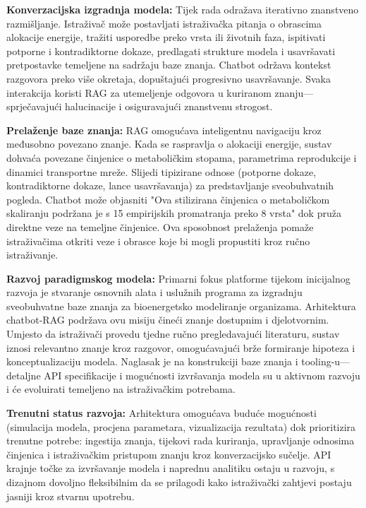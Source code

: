 \documentclass[12pt,a4paper]{article}
\begin{document}
\textbf{Konverzacijska izgradnja modela:} Tijek rada odražava iterativno znanstveno razmišljanje. Istraživač može postavljati istraživačka pitanja o obrascima alokacije energije, tražiti usporedbe preko vrsta ili životnih faza, ispitivati potporne i kontradiktorne dokaze, predlagati strukture modela i usavršavati pretpostavke temeljene na sadržaju baze znanja. Chatbot održava kontekst razgovora preko više okretaja, dopuštajući progresivno usavršavanje. Svaka interakcija koristi RAG za utemeljenje odgovora u kuriranom znanju—sprječavajući halucinacije i osiguravajući znanstvenu strogost.

\textbf{Prelaženje baze znanja:} RAG omogućava inteligentnu navigaciju kroz međusobno povezano znanje. Kada se raspravlja o alokaciji energije, sustav dohvaća povezane činjenice o metaboličkim stopama, parametrima reprodukcije i dinamici transportne mreže. Slijedi tipizirane odnose (potporne dokaze, kontradiktorne dokaze, lance usavršavanja) za predstavljanje sveobuhvatnih pogleda. Chatbot može objasniti "Ova stilizirana činjenica o metaboličkom skaliranju podržana je s 15 empirijskih promatranja preko 8 vrsta" dok pruža direktne veze na temeljne činjenice. Ova sposobnost prelaženja pomaže istraživačima otkriti veze i obrasce koje bi mogli propustiti kroz ručno istraživanje.

\textbf{Razvoj paradigmskog modela:} Primarni fokus platforme tijekom inicijalnog razvoja je stvaranje osnovnih alata i uslužnih programa za izgradnju sveobuhvatne baze znanja za bioenergetsko modeliranje organizama. Arhitektura chatbot-RAG podržava ovu misiju čineći znanje dostupnim i djelotvornim. Umjesto da istraživači provedu tjedne ručno pregledavajući literaturu, sustav iznosi relevantno znanje kroz razgovor, omogućavajući brže formiranje hipoteza i konceptualizaciju modela. Naglasak je na konstrukciji baze znanja i tooling-u—detaljne API specifikacije i mogućnosti izvršavanja modela su u aktivnom razvoju i će evoluirati temeljeno na istraživačkim potrebama.

\textbf{Trenutni status razvoja:} Arhitektura omogućava buduće mogućnosti (simulacija modela, procjena parametara, vizualizacija rezultata) dok prioritizira trenutne potrebe: ingestija znanja, tijekovi rada kuriranja, upravljanje odnosima činjenica i istraživačkim pristupom znanju kroz konverzacijsko sučelje. API krajnje točke za izvršavanje modela i naprednu analitiku ostaju u razvoju, s dizajnom dovoljno fleksibilnim da se prilagodi kako istraživački zahtjevi postaju jasniji kroz stvarnu upotrebu.
\end{document}

